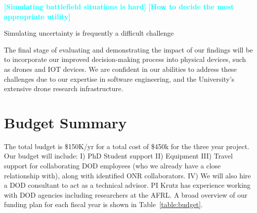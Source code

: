 \documentclass{article}
\newcommand{\todo}[1]{\textcolor{cyan}{\textbf{[#1]}}}
\begin{document}
\todo{Simulating battlefield situations is hard}
\todo{How to decide the most appropriate utility}






Simulating uncertainty is frequently a difficult challenge







The final stage of evaluating and demonstrating the impact of our findings will be to incorporate our improved decision-making process into physical devices, such as drones and IOT devices. We are confident in our abilities to address these challenges due to our expertise in software engineering, and the University's extensive drone research infrastructure. %





\section{Budget Summary}

The total budget is \$150K/yr for a total cost of \$450k for the three year project. Our budget will include: I) PhD Student support II) Equipment III) Travel support for collaborating DOD employees (who we already have a close relationship with), along with identified ONR collaborators. IV) We will also hire a DOD consultant to act as a technical advisor. PI Krutz has experience working with DOD agencies including researchers at the AFRL. A broad overview of our funding plan for each fiscal year is shown in Table~\ref{table:budget}.

 

\end{document}

